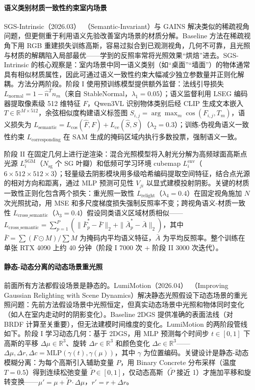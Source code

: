 \paragraph{语义类别材质一致性约束室内场景}

SGS-Intrinsic（2026.03）~\cite{2603_27516}（Semantic-Invariant）与 GAINS 解决类似的稀疏视角问题，但更侧重于利用语义先验改善室内场景的材质分解。Baseline 方法在稀疏视角下用 RGB 重建损失训练高斯，容易过拟合到已观测视角，几何不可靠，且光照与材质的解耦陷入局部最优——学到的反照率常将光照效果“烘焙”进去。SGS-Intrinsic 的核心观察是：室内场景中同一语义类别（如“桌面”“墙面”）的物体通常具有相似材质属性，因此可通过语义一致性约束大幅减少独立参数量并正则化解耦。方法分两阶段。阶段 I 使用预训练模型提供额外监督：法线引导损失 $L_{\text{normal}} = 1 - \hat{n}^T n_m$（来自 StableNormal，$\lambda_1=0.05$）；语义监督利用 LSEG 编码器提取像素级 512 维特征 $F$，Qwen3VL 识别物体类别后经 CLIP 生成文本嵌入 $T \in \mathbb{R}^{M \times 512}$，余弦相似度构建语义标签图 $S_{i,j} = \arg\max_m \cos(F_{i,j}, T_m)$，语义损失为 $L_{\text{semantic}} = L_{\text{cos}}(\hat{F}, F) + L_{\text{ce}}(\hat{S}, S)$（$\lambda_2=0.3$）；训练-伪视角语义一致性约束 $L_{\text{corresponding}}$ 在 SAM 生成的掩码区域内执行多数投票，强制语义一致。

阶段 II 在固定几何上进行逆渲染：混合光照模型将入射光分解为高频球面高斯点光源 $L_i^{\text{SGM}}$（$N_{\text{sg}}$ 个 SG 叶瓣）和低频可学习环境 cubemap $L_i^{\text{env}}$（$6 \times 512 \times 512 \times 3$）；轻量级去阴影模块用多级哈希编码提取空间特征，结合点光源的相对方向和距离，通过 MLP 预测可见性 $V_{ji}$ 以显式建模投射阴影。关键的材质一致性正则化包含两个损失：重光照一致性 $L_{\text{relight}}$（$\lambda_4=0.4$）在固定视角施加 $N$ 次光照扰动，用 MSE 和多尺度梯度损失强制反照率不变；跨视角语义-材质一致性 $L_{\text{cross\_semantic}}$（$\lambda_3=0.4$）假设同类语义区域材质相似——$L_{\text{cross\_semantic}} = \sum_{p=1}^P (\|\bar{F}_p^* - \bar{F}\|_2 + \|\bar{A}_p^* - \bar{A}\|_2)$，其中 $\bar{F} = \sum(F \odot M) / \sum M$ 为掩码内平均语义特征，$\bar{A}$ 为平均反照率。整个训练在单张 RTX 4090 上约 40 分钟（阶段 I 7000 次 + 阶段 II 3000 次迭代）。

\paragraph{静态-动态分离的动态场景重光照}

前面所有方法都假设场景是静态的。LumiMotion（2026.04）~\cite{2604_10994}（Improving Gaussian Relighting with Scene Dynamics）解决静态光照假设下动态场景的重光照问题：先前方法假设场景中光照恒定，但真实动态场景中光照和物体同时变化（如人在室内走动时的阴影变化）。Baseline 2DGS 提供准确的表面法线（对 BRDF 计算至关重要），但无法建模时间维度的变化。LumiMotion 的两阶段管线如下。阶段 I 学习动态几何：基于 2DGS，用 MLP 预测每个时间步 $t \in [0,1]$ 下高斯的平移 $\Delta \mu \in \mathbb{R}^3$、旋转 $\Delta r \in \mathbb{R}^3$ 和颜色变化 $\Delta c \in \mathbb{R}^3$——$\Delta \mu, \Delta r, \Delta c = \text{MLP}(\gamma(t), \gamma(\mu))$，其中 $\gamma$ 为位置编码。关键设计是静态-动态模糊分离：为每个高斯引入辅助变量 $P$，用 Binary Concrete 分布采样（温度 $T=0.5$）得到连续松弛变量 $\tilde{P} \in [0,1]$，仅动态高斯（$\tilde{P}$ 接近 1）才施加平移和旋转变换——$\mu' = \mu + \tilde{P} \cdot \Delta \mu$，$r' = r + \Delta r$。

